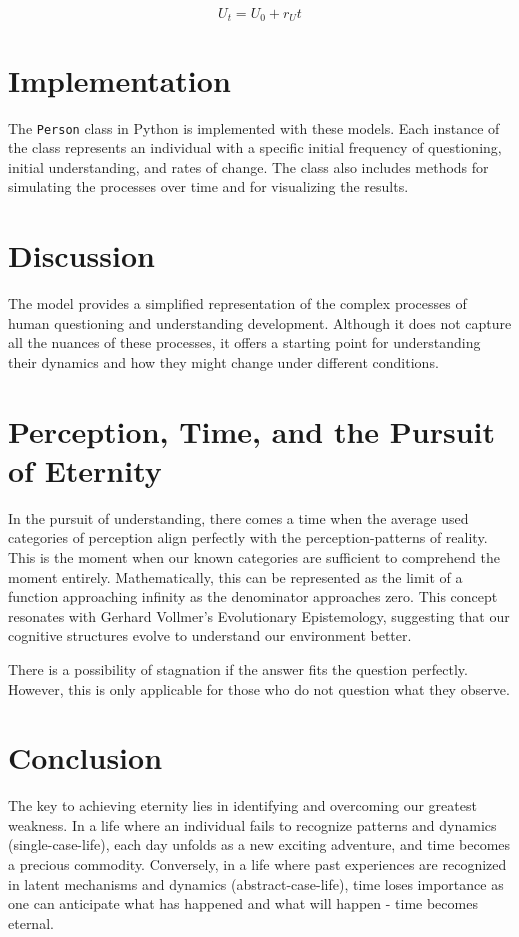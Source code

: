 \documentclass{article}
\begin{document}
\[
U_t = U_0 + r_U t
\]

\section{Implementation}

The \texttt{Person} class in Python is implemented with these models. Each instance of the class represents an individual with a specific initial frequency of questioning, initial understanding, and rates of change. The class also includes methods for simulating the processes over time and for visualizing the results.

\section{Discussion}

The model provides a simplified representation of the complex processes of human questioning and understanding development. Although it does not capture all the nuances of these processes, it offers a starting point for understanding their dynamics and how they might change under different conditions.

\section{Perception, Time, and the Pursuit of Eternity}

In the pursuit of understanding, there comes a time when the average used categories of perception align perfectly with the perception-patterns of reality. This is the moment when our known categories are sufficient to comprehend the moment entirely. Mathematically, this can be represented as the limit of a function approaching infinity as the denominator approaches zero. This concept resonates with Gerhard Vollmer's Evolutionary Epistemology, suggesting that our cognitive structures evolve to understand our environment better.

There is a possibility of stagnation if the answer fits the question perfectly. However, this is only applicable for those who do not question what they observe.

\section{Conclusion}

The key to achieving eternity lies in identifying and overcoming our greatest weakness. In a life where an individual fails to recognize patterns and dynamics (single-case-life), each day unfolds as a new exciting adventure, and time becomes a precious commodity. Conversely, in a life where past experiences are recognized in latent mechanisms and dynamics (abstract-case-life), time loses importance as one can anticipate what has happened and what will happen - time becomes eternal.
\end{document}
